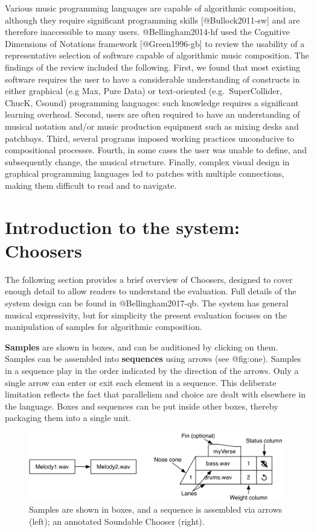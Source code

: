 \documentclass[]{article}
\begin{document}
Various music programming languages are capable of algorithmic
composition, although they require significant programming skills
{[}@Bullock2011-sw{]} and are therefore inaccessible to many users.
@Bellingham2014-hf used the Cognitive Dimensions of Notations framework
{[}@Green1996-gb{]} to review the usability of a representative
selection of software capable of algorithmic music composition. The
findings of the review included the following. First, we found that most
existing software requires the user to have a considerable understanding
of constructs in either graphical (e.g Max, Pure Data) or text-oriented
(e.g.~SuperCollider, ChucK, Csound) programming languages: such
knowledge requires a significant learning overhead. Second, users are
often required to have an understanding of musical notation and/or music
production equipment such as mixing desks and patchbays. Third, several
programs imposed working practices unconducive to compositional
processes. Fourth, in some cases the user was unable to define, and
subsequently change, the musical structure. Finally, complex visual
design in graphical programming languages led to patches with multiple
connections, making them difficult to read and to navigate.

\hypertarget{sec:system}{%
\section{Introduction to the system: Choosers}\label{sec:system}}

The following section provides a brief overview of Choosers, designed to
cover enough detail to allow readers to understand the evaluation. Full
details of the system design can be found in @Bellingham2017-qb. The
system has general musical expressivity, but for simplicity the present
evaluation focuses on the manipulation of samples for algorithmic
composition.

\textbf{Samples} are shown in boxes, and can be auditioned by clicking
on them. Samples can be assembled into \textbf{sequences} using arrows
(see @fig:one). Samples in a sequence play in the order indicated by the
direction of the arrows. Only a single arrow can enter or exit each
element in a sequence. This deliberate limitation reflects the fact that
parallelism and choice are dealt with elsewhere in the language. Boxes
and sequences can be put inside other boxes, thereby packaging them into
a single unit.

\begin{figure}
\hypertarget{fig:one}{%
\centering
\includegraphics{./media/image1.png}
\caption{Samples are shown in boxes, and a sequence is assembled via
arrows (left); an annotated Soundable Chooser (right).}\label{fig:one}
}
\end{figure}
\end{document}
